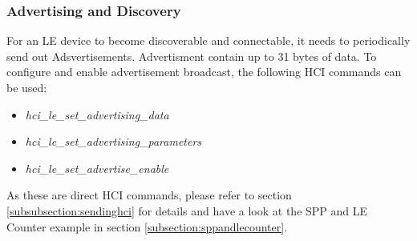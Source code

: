
\subsubsection{Advertising and Discovery}

For an LE device to become discoverable and connectable, it needs to periodically send out Adsvertisements. Advertisment contain up to 31 bytes of data. To configure and enable advertisement broadcast, the following HCI commands can be used:
\begin{itemize}
\item \emph{hci\_le\_set\_advertising\_data}
\item \emph{hci\_le\_set\_advertising\_parameters}
\item \emph{hci\_le\_set\_advertise\_enable}
\end{itemize}
As these are direct HCI commands, please refer to section \ref{subsubsection:sendinghci} for details and have a look at the SPP and LE Counter example in section \ref{subsection:sppandlecounter}.

